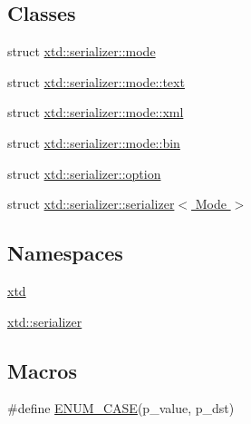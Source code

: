 \subsection*{Classes}
\begin{DoxyCompactItemize}
\item 
struct \hyperlink{structxtd_1_1serializer_1_1mode}{xtd\-::serializer\-::mode}
\item 
struct \hyperlink{structxtd_1_1serializer_1_1mode_1_1text}{xtd\-::serializer\-::mode\-::text}
\item 
struct \hyperlink{structxtd_1_1serializer_1_1mode_1_1xml}{xtd\-::serializer\-::mode\-::xml}
\item 
struct \hyperlink{structxtd_1_1serializer_1_1mode_1_1bin}{xtd\-::serializer\-::mode\-::bin}
\item 
struct \hyperlink{structxtd_1_1serializer_1_1option}{xtd\-::serializer\-::option}
\item 
struct \hyperlink{structxtd_1_1serializer_1_1serializer}{xtd\-::serializer\-::serializer$<$ Mode $>$}
\end{DoxyCompactItemize}
\subsection*{Namespaces}
\begin{DoxyCompactItemize}
\item 
\hyperlink{namespacextd}{xtd}
\item 
\hyperlink{namespacextd_1_1serializer}{xtd\-::serializer}
\end{DoxyCompactItemize}
\subsection*{Macros}
\begin{DoxyCompactItemize}
\item 
\#define \hyperlink{serializer_8hh_a54ebd30f6967d7f47176460bf889311b}{E\-N\-U\-M\-\_\-\-C\-A\-S\-E}(p\-\_\-value, p\-\_\-dst)
\end{DoxyCompactItemize}
